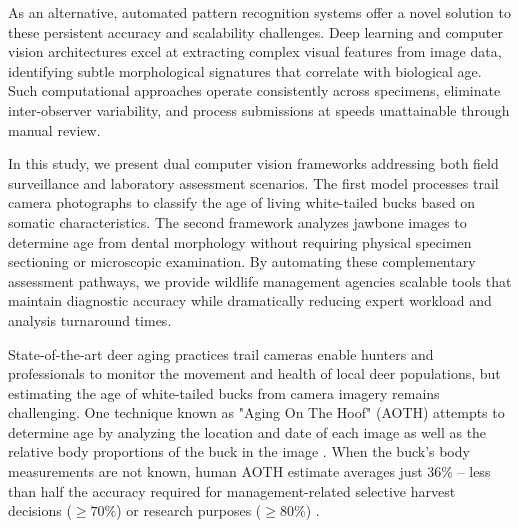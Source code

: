 \documentclass{iopjournal}
\begin{document}
As an alternative, automated pattern recognition systems offer a novel solution to these persistent accuracy and scalability challenges. Deep learning and computer vision architectures excel at extracting complex visual features from image data, identifying subtle morphological signatures that correlate with biological age. Such computational approaches operate consistently across specimens, eliminate inter-observer variability, and process submissions at speeds unattainable through manual review.

In this study, we present dual computer vision frameworks addressing both field surveillance and laboratory assessment scenarios. The first model processes trail camera photographs to classify the age of living white-tailed bucks based on somatic characteristics. The second framework analyzes jawbone images to determine age from dental morphology without requiring physical specimen sectioning or microscopic examination. By automating these complementary assessment pathways, we provide wildlife management agencies scalable tools that maintain diagnostic accuracy while dramatically reducing expert workload and analysis turnaround times.






State-of-the-art deer aging practices trail cameras enable hunters and professionals to monitor the movement and health of local deer populations, but estimating the age of white-tailed bucks from camera imagery remains challenging. One technique known as "Aging On The Hoof" (AOTH) attempts to determine age by analyzing the location and date of each image as well as the relative body proportions of the buck in the image \cite{1996Kroll, 1978Knowlton, 1999Demarais, 2003Richards, 2008Hellickson}. When the buck's body measurements are not known, human AOTH estimate averages just 36\% -- less than half the accuracy required for management-related selective harvest decisions ($\geq70\%$) or research purposes ($\geq80\%$) \cite{2014Gee}. 

\end{document}
